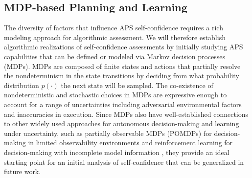 
\subsection{MDP-based Planning and Learning}
The diversity of factors that influence APS self-confidence requires a rich modeling approach for algorithmic assessment. We will therefore establish algorithmic realizations of self-confidence assessments by initially studying APS capabilities that can be defined or modeled via Markov decision processes (MDPs). MDPs are composed of finite states and actions that partially resolve the nondeterminism in the state transitions by deciding from what probability distribution $p(\cdot)$ the next state will be sampled. The co-existence of nondeterministic and stochastic choices in MDPs are expressive enough to account for a range of uncertainties including adversarial environmental factors and inaccuracies in execution. %
Since MDPs also have well-established connections to other widely used approaches for autonomous decision-making and learning under uncertainty, such as partially observable MDPs (POMDPs) for decision-making in limited observability environments and reinforcement learning for decision-making with incomplete model information \cite{KochenderferBook}, they provide an ideal starting point for an initial analysis of self-confidence that can be generalized in future work. 

